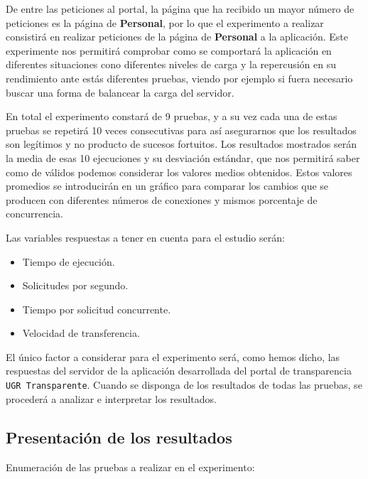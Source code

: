 \bigskip
De entre las peticiones al portal, la página que ha recibido un mayor número de peticiones es la página de \textbf{Personal}, por lo que el experimento a realizar consistirá en realizar peticiones de la página de \textbf{Personal} a la aplicación. Este experimente nos permitirá comprobar como se comportará la aplicación en diferentes situaciones cono diferentes niveles de carga y la repercusión en su rendimiento ante estás diferentes pruebas, viendo por ejemplo si fuera necesario buscar una forma de balancear la carga del servidor. 

\bigskip
En total el experimento constará de 9 pruebas, y a su vez cada una de estas pruebas se repetirá 10 veces consecutivas para así asegurarnos que los resultados son legítimos y no producto de sucesos fortuitos. Los resultados mostrados serán la media de esas 10 ejecuciones y su desviación estándar, que nos permitirá saber como de válidos podemos considerar los valores medios obtenidos. Estos valores promedios se introducirán en un gráfico para comparar los cambios que se producen con diferentes números de conexiones y mismos porcentaje de concurrencia.

\bigskip
Las variables respuestas a tener en cuenta para el estudio serán:

\begin{itemize}
	\item Tiempo de ejecución.
	\item Solicitudes por segundo.
	\item Tiempo por solicitud concurrente.
	\item Velocidad de transferencia.
\end{itemize}

\bigskip
El único factor a considerar para el experimento será, como hemos dicho, las respuestas del servidor de la aplicación desarrollada del portal de transparencia {\tt UGR Transparente}. Cuando se disponga de los resultados de todas las pruebas, se procederá a analizar e interpretar los resultados.

\subsection{Presentación de los resultados}

Enumeración de las pruebas a realizar en el experimento:

